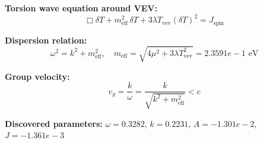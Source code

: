 
\textbf{Torsion wave equation around VEV:}
\begin{equation}
  \Box \delta T + m_{\text{eff}}^2 \, \delta T + 3\lambda T_{\text{vev}} (\delta T)^2 = J_{\text{spin}}
\end{equation}

\textbf{Dispersion relation:}
\begin{equation}
  \omega^2 = k^2 + m_{\text{eff}}^2, \quad
  m_{\text{eff}} = \sqrt{4\mu^2 + 3\lambda T_{\text{vev}}^2} = 2.3591e-1 \text{ eV}
\end{equation}

\textbf{Group velocity:}
\begin{equation}
  v_g = \frac{k}{\omega} = \frac{k}{\sqrt{k^2 + m_{\text{eff}}^2}} < c
\end{equation}

\textbf{Discovered parameters:}
$\omega = 0.3282$, \quad
$k = 0.2231$, \quad
$A = -1.301e-2$, \quad
$J = -1.361e-3$